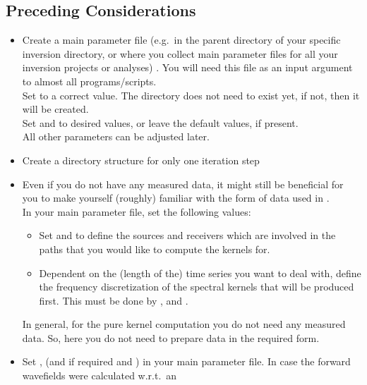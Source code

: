 \subsection*{Preceding Considerations}
%
\begin{itemize}
\item Create a main parameter file (e.g.\ in the parent directory of your specific inversion directory, 
or where you collect main parameter files for all your inversion projects or analyses)
. You will need this file as an input argument to almost all programs/scripts.\\
Set  to a correct value.
The directory does not need to exist yet, if not, then it will be created. \\
Set  and 
 to desired values, 
or leave the default values, if present.\\
All other parameters can be adjusted later. 
%
\item Create a directory structure for only one iteration step 
%
\item Even if you do not have any measured data, it might still be beneficial for you to make yourself 
(roughly) familiar with the form of data used in \ASKI{} . \\
In your main parameter file, set the following values: 
  \begin{itemize}
  \item Set  and  to define the sources and receivers which are
    involved in the paths that you would like to compute the kernels for. 
  \item Dependent on the (length of the) time series you want to deal with, define the frequency discretization of the
    spectral kernels that will be produced first. This must be done by , 
     and .
  \end{itemize}
In general, for the pure kernel computation you do not need any measured data. So, here you do not need to prepare
data in the \ASKI{} required form.
%
\item Set ,  (and if required  and 
  ) in your main parameter file. In case the forward wavefields were calculated w.r.t.\ an

\end{itemize}
